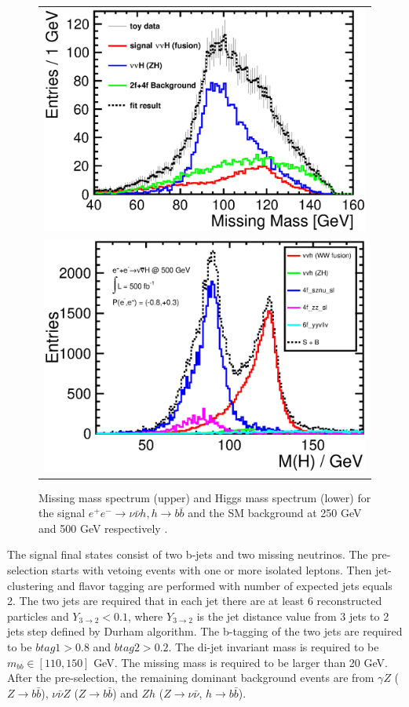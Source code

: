 \begin{figure}
\begin{tabular}[c]{c}
\includegraphics[width=0.85\hsize]{chapters/figures/vvH_MissingMass250.eps} \\
\includegraphics[width=0.85\hsize]{chapters/figures/vvH_MassH500.eps}
\end{tabular}
  \caption{Missing mass spectrum (upper) and Higgs mass spectrum (lower) 
  for the signal $e^+e^-\to\nu\bar\nu h, h\to b \bar{b}$ and the SM background 
  at 250 GeV and 500 GeV respectively \cite{Durig:2014lfa,Tian:2017}.}
  \label{fig:vvHbb}
\end{figure}

The signal final states consist of two b-jets and two missing neutrinos.
The pre-selection starts with vetoing events with one or more isolated 
leptons. Then jet-clustering and flavor tagging are performed with number of
expected jets equals 2. The two jets are required that in each jet there are at least 6
reconstructed particles and $Y_{3\to2}<0.1$, where $Y_{3\to 2}$ is the 
jet distance value from 3 jets to 2 jets step defined by Durham algorithm. The 
b-tagging of the two jets are required to be $btag1>0.8$ and $btag2>0.2$.
The di-jet invariant mass is required to be $m_{bb}\in[110,150]$ GeV.
The missing mass is required to be larger than 20 GeV.
After the pre-selection, the remaining dominant background events are
from $\gamma Z$ ($Z\to b\bar{b}$), $\nu\bar{\nu}Z$ ($Z\to b\bar{b}$) 
and $Zh$ ($Z\to\nu\bar{\nu}$, $h\to b\bar{b}$).

